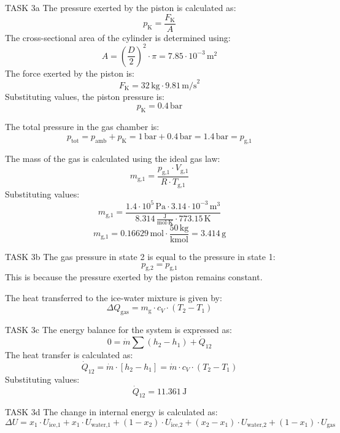 TASK 3a  
The pressure exerted by the piston is calculated as:  
\[
p_{\text{K}} = \frac{F_{\text{K}}}{A}
\]  
The cross-sectional area of the cylinder is determined using:  
\[
A = \left(\frac{D}{2}\right)^2 \cdot \pi = 7.85 \cdot 10^{-3} \, \text{m}^2
\]  
The force exerted by the piston is:  
\[
F_{\text{K}} = 32 \, \text{kg} \cdot 9.81 \, \text{m/s}^2
\]  
Substituting values, the piston pressure is:  
\[
p_{\text{K}} = 0.4 \, \text{bar}
\]  

The total pressure in the gas chamber is:  
\[
p_{\text{tot}} = p_{\text{amb}} + p_{\text{K}} = 1 \, \text{bar} + 0.4 \, \text{bar} = 1.4 \, \text{bar} = p_{\text{g,1}}
\]  

The mass of the gas is calculated using the ideal gas law:  
\[
m_{\text{g,1}} = \frac{p_{\text{g,1}} \cdot V_{\text{g,1}}}{R \cdot T_{\text{g,1}}}
\]  
Substituting values:  
\[
m_{\text{g,1}} = \frac{1.4 \cdot 10^5 \, \text{Pa} \cdot 3.14 \cdot 10^{-3} \, \text{m}^3}{8.314 \, \frac{\text{J}}{\text{mol·K}} \cdot 773.15 \, \text{K}}
\]  
\[
m_{\text{g,1}} = 0.16629 \, \text{mol} \cdot \frac{50 \, \text{kg}}{\text{kmol}} = 3.414 \, \text{g}
\]  

TASK 3b  
The gas pressure in state 2 is equal to the pressure in state 1:  
\[
p_{\text{g,2}} = p_{\text{g,1}}
\]  
This is because the pressure exerted by the piston remains constant.  

The heat transferred to the ice-water mixture is given by:  
\[
\Delta Q_{\text{gas}} = m_{\text{g}} \cdot c_V \cdot (T_2 - T_1)
\]  

TASK 3c  
The energy balance for the system is expressed as:  
\[
0 = \dot{m} \sum (h_2 - h_1) + \dot{Q}_{12}
\]  
The heat transfer is calculated as:  
\[
\dot{Q}_{12} = \dot{m} \cdot \left[h_2 - h_1\right] = \dot{m} \cdot c_V \cdot (T_2 - T_1)
\]  
Substituting values:  
\[
\dot{Q}_{12} = 11.361 \, \text{J}
\]  

TASK 3d  
The change in internal energy is calculated as:  
\[
\Delta U = x_1 \cdot U_{\text{ice,1}} + x_1 \cdot U_{\text{water,1}} + (1 - x_2) \cdot U_{\text{ice,2}} + (x_2 - x_1) \cdot U_{\text{water,2}} + (1 - x_1) \cdot U_{\text{gas}}
\]